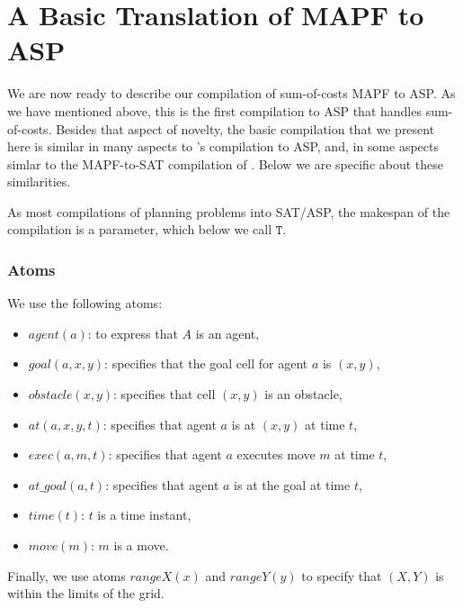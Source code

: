 \section{A Basic Translation of MAPF to ASP}
We are now ready to describe our compilation of sum-of-costs MAPF to ASP. As we have mentioned above, this is the first compilation to ASP that handles sum-of-costs. Besides that aspect of novelty, the basic compilation that we present here is similar in many aspects to \citeauthor{ErdemKOS13}'s compilation  to ASP, and, in some aspects simlar to the MAPF-to-SAT compilation of . Below we are specific about these similarities.

As most compilations of planning problems into SAT/ASP, the makespan of the compilation is a parameter, which below we call $\mathtt{T}$.

\subsubsection{Atoms}
We use the following atoms:
\begin{itemize}
\item $agent(a)$: to express that $A$ is an agent,
\item $goal(a,x,y)$: specifies that the goal cell for agent $a$ is $(x,y)$,
\item $obstacle(x,y)$: specifies that cell $(x,y)$ is an obstacle,
\item $at(a,x,y,t)$: specifies that agent $a$ is at $(x,y)$ at time $t$,
\item $exec(a,m,t)$: specifies that agent $a$ executes move $m$ at time $t$,
\item $at\_goal(a,t)$: specifies that agent $a$ is at the goal at time $t$,
\item $time(t)$: $t$ is a time instant,
\item $move(m)$: $m$ is a move.
\end{itemize}
Finally, we use atoms $rangeX(x)$ and $rangeY(y)$ to specify that $(X,Y)$ is within the limits of the grid.

